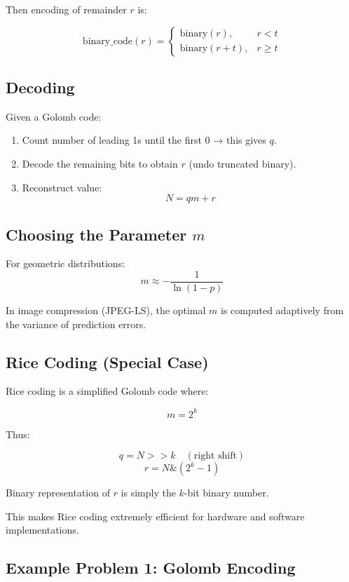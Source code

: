 \documentclass{AnantDocumentation}
\begin{document}
Then encoding of remainder \(r\) is:

\[
\text{binary\_code}(r) = 
\begin{cases}
\text{binary}(r), & r < t \\
\text{binary}(r + t), & r \ge t
\end{cases}
\]

\subsection{Decoding}

Given a Golomb code:

\begin{enumerate}
\item Count number of leading 1s until the first 0 → this gives \(q\).
\item Decode the remaining bits to obtain \(r\) (undo truncated binary).
\item Reconstruct value:
\[
N = qm + r
\]
\end{enumerate}

\subsection{Choosing the Parameter \(m\)}

For geometric distributions:
\[
m \approx -\frac{1}{\ln(1-p)}
\]

In image compression (JPEG-LS), the optimal \(m\) is computed adaptively from the variance of prediction errors.

\subsection{Rice Coding (Special Case)}

Rice coding is a simplified Golomb code where:

\[
m = 2^k
\]

Thus:

\[
q = N >> k \quad (\text{right shift})
\]
\[
r = N \& (2^k - 1)
\]

Binary representation of \(r\) is simply the \(k\)-bit binary number.

This makes Rice coding extremely efficient for hardware and software implementations.

\subsection{Example Problem 1: Golomb Encoding}
\end{document}

